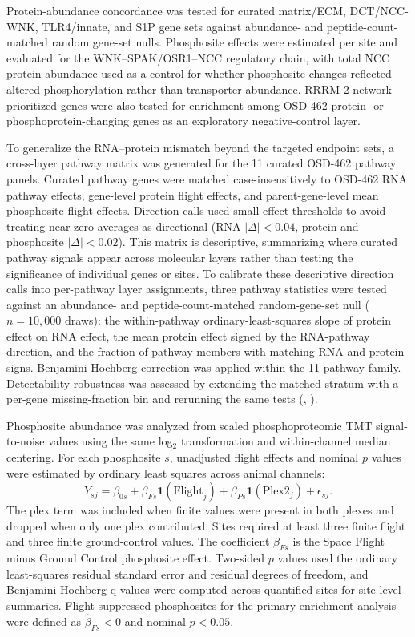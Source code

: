 \documentclass[11pt]{article}
\begin{document}
Protein-abundance concordance was tested for curated matrix/ECM, DCT/NCC-WNK, TLR4/innate, and S1P gene sets against abundance- and peptide-count-matched random gene-set nulls. Phosphosite effects were estimated per site and evaluated for the WNK--SPAK/OSR1--NCC regulatory chain, with total NCC protein abundance used as a control for whether phosphosite changes reflected altered phosphorylation rather than transporter abundance. RRRM-2 network-prioritized genes were also tested for enrichment among OSD-462 protein- or phosphoprotein-changing genes as an exploratory negative-control layer.

To generalize the RNA--protein mismatch beyond the targeted endpoint sets, a cross-layer pathway matrix was generated for the 11 curated OSD-462 pathway panels. Curated pathway genes were matched case-insensitively to OSD-462 RNA pathway effects, gene-level protein flight effects, and parent-gene-level mean phosphosite flight effects. Direction calls used small effect thresholds to avoid treating near-zero averages as directional (RNA $|\Delta|<0.04$, protein and phosphosite $|\Delta|<0.02$). This matrix is descriptive, summarizing where curated pathway signals appear across molecular layers rather than testing the significance of individual genes or sites. To calibrate these descriptive direction calls into per-pathway layer assignments, three pathway statistics were tested against an abundance- and peptide-count-matched random-gene-set null ($n=10{,}000$ draws): the within-pathway ordinary-least-squares slope of protein effect on RNA effect, the mean protein effect signed by the RNA-pathway direction, and the fraction of pathway members with matching RNA and protein signs. Benjamini-Hochberg correction was applied within the 11-pathway family. Detectability robustness was assessed by extending the matched stratum with a per-gene missing-fraction bin and rerunning the same tests (, ).

Phosphosite abundance was analyzed from scaled phosphoproteomic TMT signal-to-noise values using the same log$_2$ transformation and within-channel median centering. For each phosphosite $s$, unadjusted flight effects and nominal $p$ values were estimated by ordinary least squares across animal channels:
\[
Y_{s j}=\beta_{0s}+\beta_{Fs}\mathbf{1}(\mathrm{Flight}_j)+\beta_{Ps}\mathbf{1}(\mathrm{Plex2}_j)+\epsilon_{s j}.
\]
The plex term was included when finite values were present in both plexes and dropped when only one plex contributed. Sites required at least three finite flight and three finite ground-control values. The coefficient $\beta_{Fs}$ is the Space Flight minus Ground Control phosphosite effect. Two-sided $p$ values used the ordinary least-squares residual standard error and residual degrees of freedom, and Benjamini-Hochberg q values were computed across quantified sites for site-level summaries. Flight-suppressed phosphosites for the primary enrichment analysis were defined as $\hat{\beta}_{Fs}<0$ and nominal $p<0.05$.
\end{document}
